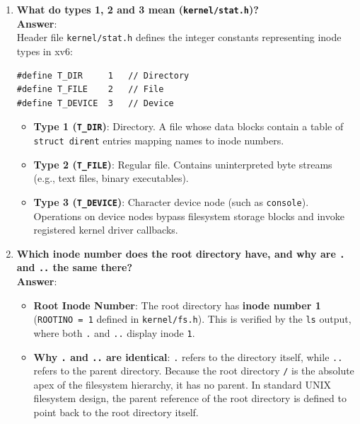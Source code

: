 \documentclass[12pt,a4paper]{article}
\begin{document}
\begin{enumerate}
    \item \textbf{What do types 1, 2 and 3 mean (\texttt{kernel/stat.h})?} \\
    \textbf{Answer}: \\
    Header file \texttt{kernel/stat.h} defines the integer constants representing inode types in xv6:
    \begin{lstlisting}[style=cstyle]
#define T_DIR     1   // Directory
#define T_FILE    2   // File
#define T_DEVICE  3   // Device
    \end{lstlisting}
    \begin{itemize}
        \item \textbf{Type 1 (\texttt{T\_DIR})}: Directory. A file whose data blocks contain a table of \texttt{struct dirent} entries mapping names to inode numbers.
        \item \textbf{Type 2 (\texttt{T\_FILE})}: Regular file. Contains uninterpreted byte streams (e.g., text files, binary executables).
        \item \textbf{Type 3 (\texttt{T\_DEVICE})}: Character device node (such as \texttt{console}). Operations on device nodes bypass filesystem storage blocks and invoke registered kernel driver callbacks.
    \end{itemize}

    \item \textbf{Which inode number does the root directory have, and why are \texttt{.} and \texttt{..} the same there?} \\
    \textbf{Answer}:
    \begin{itemize}
        \item \textbf{Root Inode Number}: The root directory has \textbf{inode number 1} (\texttt{ROOTINO = 1} defined in \texttt{kernel/fs.h}). This is verified by the \texttt{ls} output, where both \texttt{.} and \texttt{..} display inode \texttt{1}.
        \item \textbf{Why \texttt{.} and \texttt{..} are identical}: \texttt{.} refers to the directory itself, while \texttt{..} refers to the parent directory. Because the root directory \texttt{/} is the absolute apex of the filesystem hierarchy, it has no parent. In standard UNIX filesystem design, the parent reference of the root directory is defined to point back to the root directory itself.
    \end{itemize}


\end{enumerate}
\end{document}
